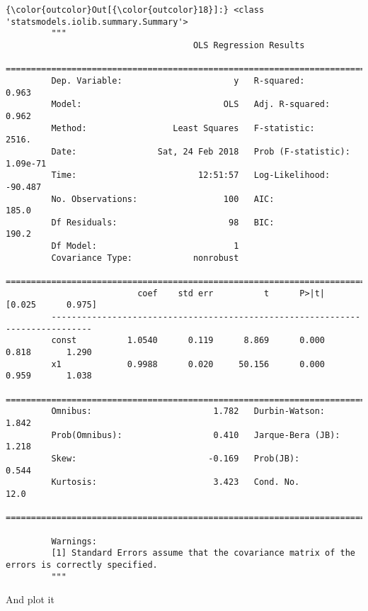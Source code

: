\documentclass[11pt]{article}
\begin{document}
\begin{Verbatim}[commandchars=\\\{\}]
{\color{outcolor}Out[{\color{outcolor}18}]:} <class 'statsmodels.iolib.summary.Summary'>
         """
                                     OLS Regression Results                            
         ==============================================================================
         Dep. Variable:                      y   R-squared:                       0.963
         Model:                            OLS   Adj. R-squared:                  0.962
         Method:                 Least Squares   F-statistic:                     2516.
         Date:                Sat, 24 Feb 2018   Prob (F-statistic):           1.09e-71
         Time:                        12:51:57   Log-Likelihood:                -90.487
         No. Observations:                 100   AIC:                             185.0
         Df Residuals:                      98   BIC:                             190.2
         Df Model:                           1                                         
         Covariance Type:            nonrobust                                         
         ==============================================================================
                          coef    std err          t      P>|t|      [0.025      0.975]
         ------------------------------------------------------------------------------
         const          1.0540      0.119      8.869      0.000       0.818       1.290
         x1             0.9988      0.020     50.156      0.000       0.959       1.038
         ==============================================================================
         Omnibus:                        1.782   Durbin-Watson:                   1.842
         Prob(Omnibus):                  0.410   Jarque-Bera (JB):                1.218
         Skew:                          -0.169   Prob(JB):                        0.544
         Kurtosis:                       3.423   Cond. No.                         12.0
         ==============================================================================
         
         Warnings:
         [1] Standard Errors assume that the covariance matrix of the errors is correctly specified.
         """
\end{Verbatim}
            
    And plot it
\end{document}
